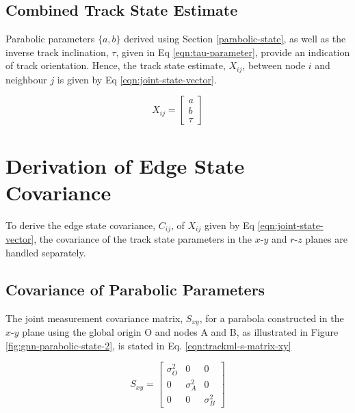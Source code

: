 \subsection{Combined Track State Estimate}

Parabolic parameters $\{a, b\}$ derived using Section \ref{parabolic-state}, as well as the inverse track inclination, $\tau$, given in Eq \eqref{eqn:tau-parameter}, provide an indication of track orientation. Hence, the track state estimate, $X_{ij}$, between node $i$ and neighbour $j$ is given by Eq \eqref{eqn:joint-state-vector}.

\begin{equation}
X_{ij} = \begin{bmatrix} a \\ b \\ \tau \end{bmatrix}
\label{eqn:joint-state-vector}
\end{equation}







\section{Derivation of Edge State Covariance}
\label{chapter-6-covariance-derivation}

To derive the edge state covariance, $C_{ij}$, of $X_{ij}$ given by Eq \eqref{eqn:joint-state-vector}, the covariance of the track state parameters in the $x$-$y$ and $r$-$z$ planes are handled separately. 


\subsection{Covariance of Parabolic Parameters}

The joint measurement covariance matrix, $S_{xy}$, for a parabola constructed in the $x$-$y$ plane using the global origin O and nodes A and B, as illustrated in Figure \ref{fig:gnn-parabolic-state-2}, is stated in Eq. \eqref{eqn:trackml-s-matrix-xy}


\begin{equation}
    S_{xy} = \begin{bmatrix} \sigma_O^{2} & 0 & 0 \\ 0 & \sigma_A^{2} & 0 \\ 0 & 0 & \sigma_B^{2} \end{bmatrix} 
    \label{eqn:trackml-s-matrix-xy}
\end{equation}

